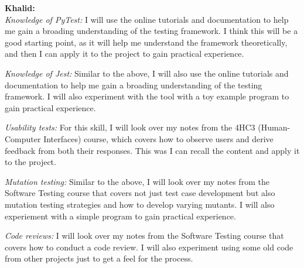 \documentclass[12pt, titlepage]{article}
\begin{document}
\begin{enumerate}
\newline
  \textbf{Khalid:}\\
  \textit{Knowledge of PyTest:} I will use the online tutorials and documentation to help me gain a broading understanding of the testing framework. I think this will be a good starting point, as it will help me understand the framework theoretically, and then I can apply it to the project to gain practical experience.
  
  \textit{Knowledge of Jest:} Similar to the above, I will also use the online tutorials and documentation to help me gain a broading understanding of the testing framework. I will also experiment with the tool with a toy example program to gain practical experience.
  
  \textit{Usability tests:} For this skill, I will look over my notes from the 4HC3 (Human-Computer Interfaces) course, which covers how to observe users and derive feedback from both their responses. This was I can recall the content and apply it to the project.
  
  \textit{Mutation testing:} Similar to the above, I will look over my notes from the Software Testing course that covers not just test case development but also mutation testing strategies and how to develop varying mutants. I will also experiement with a simple program to gain practical experience.
  
  \textit{Code reviews:} I will look over my notes from the Software Testing course that covers how to conduct a code review. I will also experiment using some old code from other projects just to get a feel for the process.
  
\end{enumerate}
\end{document}
